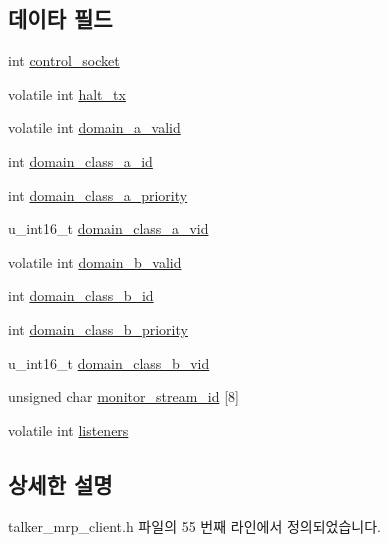 \subsection*{데이타 필드}
\begin{DoxyCompactItemize}
\item 
int \hyperlink{structmrp__talker__ctx_ab16a0c776c464dcfb5cf8a013a137647}{control\+\_\+socket}
\item 
volatile int \hyperlink{structmrp__talker__ctx_a7c8176263e9704aa667fc335cc818a3f}{halt\+\_\+tx}
\item 
volatile int \hyperlink{structmrp__talker__ctx_ae3be05692572d8c757174629541e2d91}{domain\+\_\+a\+\_\+valid}
\item 
int \hyperlink{structmrp__talker__ctx_a6e4374793667e90915abfe73f0e6201c}{domain\+\_\+class\+\_\+a\+\_\+id}
\item 
int \hyperlink{structmrp__talker__ctx_ac98b99ec0ffd190c1da93e6caffe36d4}{domain\+\_\+class\+\_\+a\+\_\+priority}
\item 
u\+\_\+int16\+\_\+t \hyperlink{structmrp__talker__ctx_ac575246135a50baaf0c802ef29aa2779}{domain\+\_\+class\+\_\+a\+\_\+vid}
\item 
volatile int \hyperlink{structmrp__talker__ctx_add1f58f9a17de764566dbf2e352b907f}{domain\+\_\+b\+\_\+valid}
\item 
int \hyperlink{structmrp__talker__ctx_a058aabd498c78e32b6610fd06f90fc43}{domain\+\_\+class\+\_\+b\+\_\+id}
\item 
int \hyperlink{structmrp__talker__ctx_a90efafdfc3b16f51cc0f67aa65796a3c}{domain\+\_\+class\+\_\+b\+\_\+priority}
\item 
u\+\_\+int16\+\_\+t \hyperlink{structmrp__talker__ctx_a153312a7212b932f60b49a67309f2053}{domain\+\_\+class\+\_\+b\+\_\+vid}
\item 
unsigned char \hyperlink{structmrp__talker__ctx_a0be105011a16541a479847730d7321c9}{monitor\+\_\+stream\+\_\+id} \mbox{[}8\mbox{]}
\item 
volatile int \hyperlink{structmrp__talker__ctx_a70763450542106f6508fd1051eade47d}{listeners}
\end{DoxyCompactItemize}


\subsection{상세한 설명}


talker\+\_\+mrp\+\_\+client.\+h 파일의 55 번째 라인에서 정의되었습니다.



